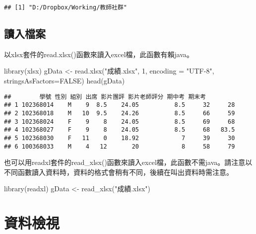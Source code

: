 \documentclass[
]{book}
\newenvironment{Shaded}{\begin{snugshade}}{\end{snugshade}}
\newcommand{\AttributeTok}[1]{\textcolor[rgb]{0.77,0.63,0.00}{#1}}
\newcommand{\ConstantTok}[1]{\textcolor[rgb]{0.00,0.00,0.00}{#1}}
\newcommand{\DecValTok}[1]{\textcolor[rgb]{0.00,0.00,0.81}{#1}}
\newcommand{\FunctionTok}[1]{\textcolor[rgb]{0.00,0.00,0.00}{#1}}
\newcommand{\NormalTok}[1]{#1}
\newcommand{\OtherTok}[1]{\textcolor[rgb]{0.56,0.35,0.01}{#1}}
\newcommand{\StringTok}[1]{\textcolor[rgb]{0.31,0.60,0.02}{#1}}
\begin{document}
\begin{verbatim}
## [1] "D:/Dropbox/Working/教師社群"
\end{verbatim}

\hypertarget{ux8b80ux5165ux6a94ux6848}{%
\subsection{讀入檔案}\label{ux8b80ux5165ux6a94ux6848}}

以xlsx套件的read.xlsx()函數來讀入excel檔，此函數有賴java。

\begin{Shaded}
\begin{Highlighting}[]
\FunctionTok{library}\NormalTok{(xlsx)}
\NormalTok{gData }\OtherTok{\textless{}{-}} \FunctionTok{read.xlsx}\NormalTok{(}\StringTok{"成績.xlsx"}\NormalTok{, }\DecValTok{1}\NormalTok{, }\AttributeTok{encoding =} \StringTok{"UTF{-}8"}\NormalTok{, }\AttributeTok{stringsAsFactors=}\ConstantTok{FALSE}\NormalTok{)}
\FunctionTok{head}\NormalTok{(gData)}
\end{Highlighting}
\end{Shaded}

\begin{verbatim}
##        學號 性別 組別 出席 影片團評 影片老師評分 期中考 期末考
## 1 102368014    M    9  8.5    24.05          8.5     32     28
## 2 102368018    M   10  9.5    24.26          8.5     66     59
## 3 102368024    F    9    8    24.05          8.5     69     68
## 4 102368027    F    9    8    24.05          8.5     68   83.5
## 5 102368030    F   11    0    18.92            7     39     30
## 6 100368033    M    4   12       20            8     58     79
\end{verbatim}

也可以用readxl套件的read\_xlsx()函數來讀入excel檔，此函數不需java。請注意以不同函數讀入資料時，資料的格式會稍有不同，後續在叫出資料時需注意。

\begin{Shaded}
\begin{Highlighting}[]
\FunctionTok{library}\NormalTok{(readxl)}
\NormalTok{gData }\OtherTok{\textless{}{-}} \FunctionTok{read\_xlsx}\NormalTok{(}\StringTok{"成績.xlsx"}\NormalTok{)}
\end{Highlighting}
\end{Shaded}

\hypertarget{ux8cc7ux6599ux6aa2ux8996}{%
\section{資料檢視}\label{ux8cc7ux6599ux6aa2ux8996}}
\end{document}
